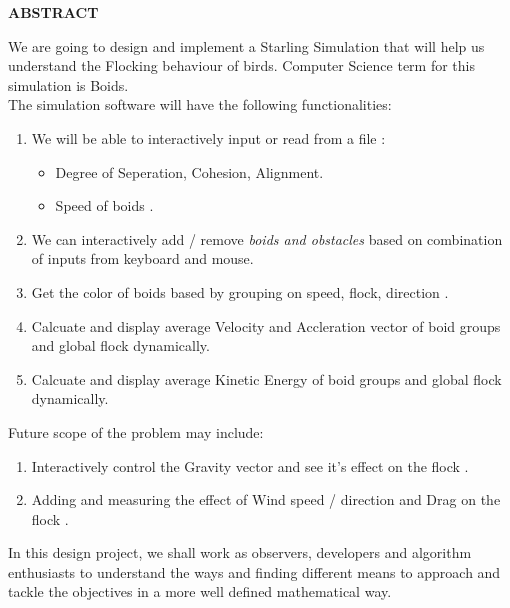 \documentclass[12pt]{report}
\begin{document}
\newpage



\begin{center}
\Large \bf ABSTRACT
\end{center}
\vspace{0.2in}

We are going to design and implement a Starling Simulation that will help us understand the Flocking behaviour of birds. Computer Science term for this simulation is Boids.
\\
\vspace{0.3cm}
The simulation software will have the following functionalities:

\begin{enumerate}
  \item
  We will be able to interactively input or read from a file :
  \begin{itemize}
    \item
    Degree of Seperation, Cohesion, Alignment.  
    \item
    Speed of boids .
  \end{itemize}
  \item
  We can interactively add / remove \textit{ boids and obstacles } based on combination of inputs from keyboard and mouse. 
  \item
  Get the color of boids based by grouping on speed, flock, direction .
  \item
  Calcuate and display average Velocity and Accleration vector of boid groups and global flock dynamically.
  \item
  Calcuate and display average Kinetic Energy of boid groups and global flock dynamically.
\end{enumerate}


\vspace{0.5cm}
Future scope of the problem may include:

\begin{enumerate}
  \item
  Interactively control the Gravity vector and see it's effect on the flock .
  \item
  Adding and measuring the effect of Wind speed / direction and Drag on the flock .
\end{enumerate}


\vspace{0.5cm}


In this design project, we shall work as observers, developers and algorithm enthusiasts to understand the ways and finding different means to approach and tackle the objectives in a more well defined mathematical way. 
\end{document}

